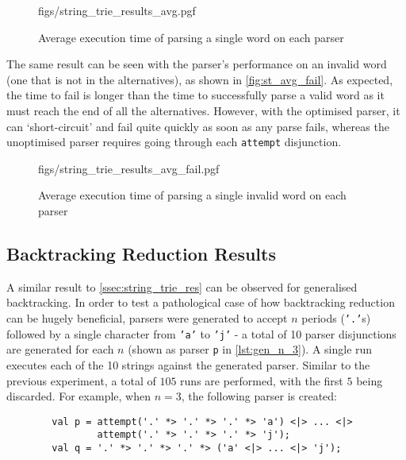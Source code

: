\begin{figure}[H]
    \centering
    {figs/string_trie_results_avg.pgf}
    \vspace{-0.5\baselineskip}
    \caption{Average execution time of parsing a single word on each parser}
    \label{fig:st_avg}
\end{figure}

The same result can be seen with the parser's performance on an invalid word (one that is not in the alternatives), as shown in \autoref{fig:st_avg_fail}.
As expected, the time to fail is longer than the time to successfully parse a valid word as it must reach the end of all the alternatives.
However, with the optimised parser, it can `short-circuit' and fail quite quickly as soon as any parse fails, whereas the unoptimised parser requires going through each \texttt{attempt} disjunction.

\begin{figure}[H]
    \centering
    {figs/string_trie_results_avg_fail.pgf}
    \vspace{-0.5\baselineskip}
    \caption{Average execution time of parsing a single invalid word on each parser}
    \label{fig:st_avg_fail}
\end{figure}

\subsection{Backtracking Reduction Results}
\label{ssec:backtrack_res}

A similar result to \autoref{ssec:string_trie_res} can be observed for generalised backtracking.
In order to test a pathological case of how backtracking reduction can be hugely beneficial, parsers were generated to accept $n$ periods (\texttt{'.'}s) followed by a single character from \texttt{'a'} to \texttt{'j'} - a total of 10 parser disjunctions are generated for each $n$ (shown as parser \texttt{p} in \autoref{lst:gen_n_3}).
A single run executes each of the 10 strings against the generated parser.
Similar to the previous experiment, a total of $105$ runs are performed, with the first $5$ being discarded.
For example, when $n = 3$, the following parser is created:

\begin{capminted}
    \begin{verbatim}
        val p = attempt('.' *> '.' *> '.' *> 'a') <|> ... <|>
                attempt('.' *> '.' *> '.' *> 'j');
        val q = '.' *> '.' *> '.' *> ('a' <|> ... <|> 'j');
    \end{verbatim}
    \vspace{-0.5\baselineskip}
    \caption{Pathological of a parser that requires backtracking for $n = 3$ (\texttt{p}) and the `optimised' result (\texttt{q})}
    \label{lst:gen_n_3}
\end{capminted}

